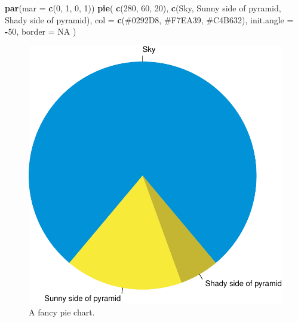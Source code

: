 \documentclass[
]{book}
\newenvironment{Shaded}{\begin{snugshade}}{\end{snugshade}}
\newcommand{\AttributeTok}[1]{\textcolor[rgb]{0.13,0.29,0.53}{#1}}
\newcommand{\ConstantTok}[1]{\textcolor[rgb]{0.56,0.35,0.01}{#1}}
\newcommand{\DecValTok}[1]{\textcolor[rgb]{0.00,0.00,0.81}{#1}}
\newcommand{\FunctionTok}[1]{\textcolor[rgb]{0.13,0.29,0.53}{\textbf{#1}}}
\newcommand{\NormalTok}[1]{#1}
\newcommand{\SpecialCharTok}[1]{\textcolor[rgb]{0.81,0.36,0.00}{\textbf{#1}}}
\newcommand{\StringTok}[1]{\textcolor[rgb]{0.31,0.60,0.02}{#1}}
\begin{document}
\begin{Shaded}
\begin{Highlighting}[]
\FunctionTok{par}\NormalTok{(}\AttributeTok{mar =} \FunctionTok{c}\NormalTok{(}\DecValTok{0}\NormalTok{, }\DecValTok{1}\NormalTok{, }\DecValTok{0}\NormalTok{, }\DecValTok{1}\NormalTok{))}
\FunctionTok{pie}\NormalTok{(}
  \FunctionTok{c}\NormalTok{(}\DecValTok{280}\NormalTok{, }\DecValTok{60}\NormalTok{, }\DecValTok{20}\NormalTok{),}
  \FunctionTok{c}\NormalTok{(}\StringTok{\textquotesingle{}Sky\textquotesingle{}}\NormalTok{, }\StringTok{\textquotesingle{}Sunny side of pyramid\textquotesingle{}}\NormalTok{, }\StringTok{\textquotesingle{}Shady side of pyramid\textquotesingle{}}\NormalTok{),}
  \AttributeTok{col =} \FunctionTok{c}\NormalTok{(}\StringTok{\textquotesingle{}\#0292D8\textquotesingle{}}\NormalTok{, }\StringTok{\textquotesingle{}\#F7EA39\textquotesingle{}}\NormalTok{, }\StringTok{\textquotesingle{}\#C4B632\textquotesingle{}}\NormalTok{),}
  \AttributeTok{init.angle =} \SpecialCharTok{{-}}\DecValTok{50}\NormalTok{, }\AttributeTok{border =} \ConstantTok{NA}
\NormalTok{)}
\end{Highlighting}
\end{Shaded}

\begin{figure}
\includegraphics[width=1\linewidth]{Rmarkdown_files/figure-latex/pie-1} \caption{A fancy pie chart.}\label{fig:pie}
\end{figure}
\end{document}
